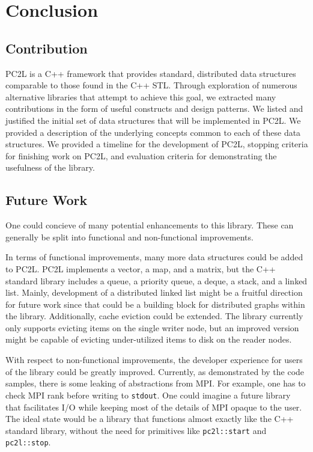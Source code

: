 \chapter{Conclusion} \label{conclusion}

\section{Contribution}
PC2L is a C++ framework that provides standard, distributed data structures comparable to those found in the C++ STL. Through exploration of numerous alternative libraries that attempt to achieve this goal, we extracted many contributions in the form of useful constructs and design patterns. We listed and justified the initial set of data structures that will be implemented in PC2L. We provided a description of the underlying concepts common to each of these data structures. We provided a timeline for the development of PC2L, stopping criteria for finishing work on PC2L, and evaluation criteria for demonstrating the usefulness of the library.  


\section{Future Work}
\label{sec:future}
One could concieve of many potential enhancements to this library.  These can generally be split into functional and non-functional improvements.

In terms of functional improvements, many more data structures could be added to PC2L. PC2L implements a vector, a map, and a matrix, but the C++ standard library includes a queue, a priority queue, a deque, a stack, and a linked list. Mainly, development of a distributed linked list might be a fruitful direction for future work since that could be a building block for distributed graphs within the library. Additionally, cache eviction could be extended. The library currently only supports evicting items on the single writer node, but an improved version might be capable of evicting under-utilized items to disk on the reader nodes.

With respect to non-functional improvements, the developer experience for users of the library could be greatly improved. Currently, as demonstrated by the code samples, there is some leaking of abstractions from MPI. For example, one has to check MPI rank before writing to \texttt{stdout}. One could imagine a future library that facilitates I/O while keeping most of the details of MPI opaque to the user. The ideal state would be a library that functions almost exactly like the C++ standard library, without the need for primitives like \texttt{pc2l::start} and \texttt{pc2l::stop}.